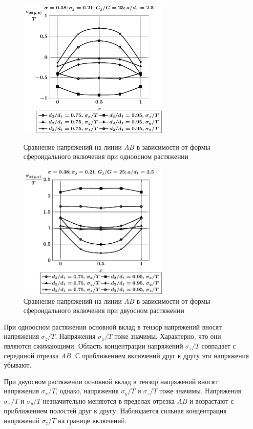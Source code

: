 \begin{figure}[h!]
\centering\footnotesize
\parbox[b]{7.5cm}{\centering\includegraphics[width=7.5cm]{periodic-inc27-d-a25-g25-t1.pdf}
\caption{Сравнение напряжений на линии $AB$ в зависимости от формы сфероидального включения при одноосном растяжении
\label{f:11:33}}}\hfil\hfil
\parbox[b]{7.5cm}{\centering\includegraphics[width=7.5cm]{periodic-inc27-d-a25-g25-t2.pdf}
\caption{Сравнение напряжений на линии $AB$ в зависимости от формы сфероидального включения при двуосном растяжении
\label{f:11:34}}}
\end{figure}

При одноосном растяжении основной вклад в тензор напряжений вносят напряжения $\sigma_z/T$. Напряжения $\sigma_x/T$ тоже значимы. Характерно, что они являются сжимающими. Область концентрации напряжений $\sigma_z/T$ совпадает с серединой отрезка $AB$. С приближением включений друг к другу эти напряжения убывают.

При двуосном растяжении основной вклад в тензор напряжений вносят напряжения $\sigma_x/T$, однако, напряжения $\sigma_y/T$ и $\sigma_z/T$ тоже значимы. Напряжения $\sigma_x/T$ и $\sigma_y/T$ незначительно меняются в пределах отрезка $AB$ и возрастают с приближением полостей друг к другу. Наблюдается сильная концентрация напряжений $\sigma_z/T$ на границе включений.

